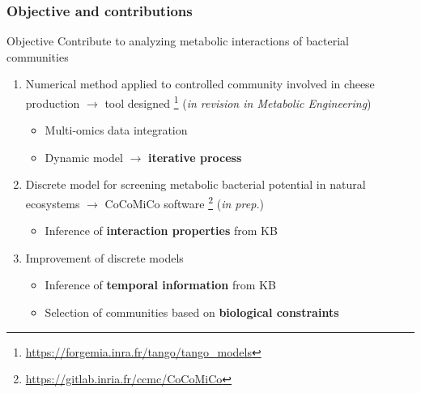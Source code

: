 \documentclass[8pt,usenames,dvipsnames]{beamer}
\begin{document}
\begin{frame}
\frametitle{Objective and contributions}
\begin{block}{Objective}
 Contribute to analyzing metabolic interactions of bacterial communities
\end{block}

\begin{enumerate}
\item Numerical method applied to controlled community involved in cheese production $\rightarrow$ tool designed \footnote{\url{https://forgemia.inra.fr/tango/tango_models}} (\textit{in revision in Metabolic Engineering})
\begin{itemize}
\item Multi-omics data integration
\item Dynamic model $\rightarrow$ \textbf{iterative process}
\end{itemize}

\item Discrete model for screening metabolic bacterial potential in natural ecosystems $\rightarrow$ CoCoMiCo software \footnote{\url{https://gitlab.inria.fr/ccmc/CoCoMiCo}} (\textit{in prep.})

\begin{itemize}
\item Inference of \textbf{interaction properties} from KB
\end{itemize}

\item Improvement of discrete models

\begin{itemize}
\item Inference of \textbf{temporal information} from KB
\item Selection of communities based on \textbf{biological constraints} 
\end{itemize}
\end{enumerate}

\end{frame}
\end{document}
